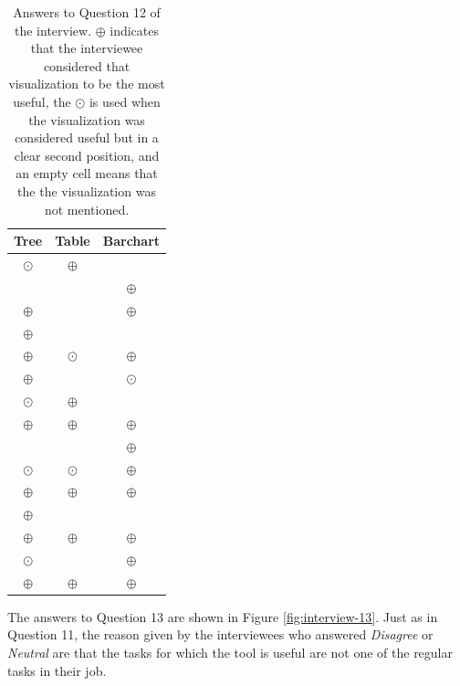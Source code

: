 \begin{table}[ht!]
    \begin{center}
    \begin{tabular}{|c|c|c|}
    \hline
    Tree      & Table     & Barchart \\
    \hline\hline
    $\odot$   & $\oplus$  & ~        \\\hline
    ~	        & ~	        & $\oplus$ \\\hline
    $\oplus$  & ~         & $\oplus$ \\\hline
    $\oplus$	& ~         & ~        \\\hline
    $\oplus$	& $\odot$	  & $\oplus$ \\\hline
    $\oplus$	& ~         & $\odot$  \\\hline
    $\odot$	  & $\oplus$	& ~        \\\hline
    $\oplus$	& $\oplus$	& $\oplus$ \\\hline
    ~	        & ~	        & $\oplus$ \\\hline
    $\odot$	  & $\odot$	  & $\oplus$ \\\hline
    $\oplus$	& $\oplus$	& $\oplus$ \\\hline
    $\oplus$	& ~	        & ~        \\\hline
    $\oplus$	& $\oplus$	& $\oplus$ \\\hline
    $\odot$	  & ~	        & $\oplus$ \\\hline
    $\oplus$	& $\oplus$	& $\oplus$ \\\hline
    \end{tabular}
    \end{center}
    \caption{Answers to Question 12 of the interview. $\oplus$ indicates that the interviewee considered that visualization to be the most useful, the $\odot$ is used when the visualization was considered useful but in a clear second position, and an empty cell means that the the visualization was not mentioned.}
    \label{table:interview-12}
\end{table}

The answers to Question 13 are shown in Figure \ref{fig:interview-13}. Just as in Question 11, the reason given by the interviewees who answered \textit{Disagree} or \textit{Neutral} are that the tasks for which the tool is useful are not one of the regular tasks in their job.

